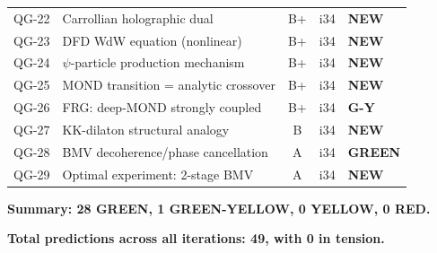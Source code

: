 \documentclass[11pt,a4paper]{article}
\newcommand{\GREEN}{\textcolor{dfdgreen}{\textbf{GREEN}}}
\newcommand{\GY}{\textcolor{dfdgy}{\textbf{G-Y}}}
\newcommand{\NEW}{\textcolor{dfdblue}{\textbf{NEW}}}
\begin{document}
\begin{center}
\begin{longtable}{lp{4.5cm}ccl}
QG-22 & Carrollian holographic dual & B+ & i34 & \NEW \\
QG-23 & DFD WdW equation (nonlinear) & B+ & i34 & \NEW \\
QG-24 & $\psi$-particle production mechanism & B+ & i34 & \NEW \\
QG-25 & MOND transition = analytic crossover & B+ & i34 & \NEW \\
QG-26 & FRG: deep-MOND strongly coupled & B+ & i34 & \GY \\
QG-27 & KK-dilaton structural analogy & B & i34 & \NEW \\
QG-28 & BMV decoherence/phase cancellation & A & i34 & \GREEN \\
QG-29 & Optimal experiment: 2-stage BMV & A & i34 & \NEW \\
\end{longtable}
\end{center}

\textbf{Summary: 28 GREEN, 1 GREEN-YELLOW, 0 YELLOW, 0 RED.}

\textbf{Total predictions across all iterations: 49, with 0 in tension.}
\end{document}
